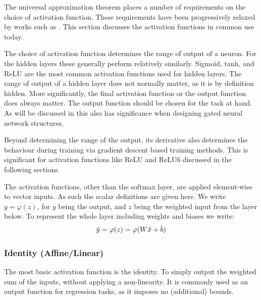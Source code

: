\documentclass[12pt,parskip]{komatufte}
\begin{document}

The universal approximation theorem places a number of requirements on the choice of activation function.
These requirements have been progressively relaxed by works such as \textcite{leshno1993uat, SONODA2017uat}.
This section discusses the activation functions in common use today.

The choice of activation function determines the range of output of a neuron.
For the hidden layers these generally perform relatively similarly.
Sigmoid, tanh, and ReLU are the most common activation functions used for hidden layers.
The range of output of a hidden layer does not normally matter, as it is by definition hidden.
More significantly, the final activation function or the output function does always matter.
The output function should be chosen for the task at hand.
As will be discussed in  this also has significance when designing gated neural network structures.


Beyond determining the range of the output, its derivative also determines the behaviour during training via gradient descent based training methods.
This is significant for activation functions like ReLU and ReLU6 discussed in the following sections.

The activation functions, other than the softmax layer, are applied element-wise to vector inputs.
As such the scalar definitions are given here.
We write $y = \varphi(z)$, for $y$ being the output, and $z$ being the weighted input from the layer below.
To represent the whole layer including weights and biases we write:
\begin{equation}
\tilde{y} =\varphi(z) = \varphi(W \tilde{x} + \tilde{b})
\end{equation}

\subsubsection{Identity (Affine/Linear)}
The most basic activation function is the identity.
To simply output the weighted sum of the inputs, without applying a non-linearity.
It is commonly used as an output function for regression tasks,
as it imposes no (additional) bounds.
\end{document}
